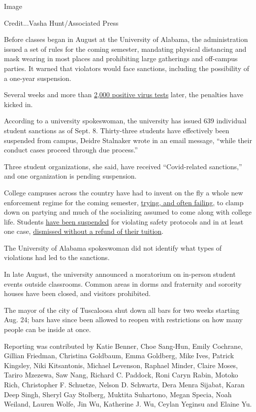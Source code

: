 Image

Credit...Vasha Hunt/Associated Press

Before classes began in August at the University of Alabama, the
administration issued a set of rules for the coming semester, mandating
physical distancing and mask wearing in most places and prohibiting
large gatherings and off-campus parties. It warned that violators would
face sanctions, including the possibility of a one-year suspension.

Several weeks and more than
\href{https://uasystem.edu/covid-19-dashboard/}{2,000 positive virus
tests} later, the penalties have kicked in.

According to a university spokeswoman, the university has issued 639
individual student sanctions as of Sept. 8. Thirty-three students have
effectively been suspended from campus, Deidre Stalnaker wrote in an
email message, ``while their conduct cases proceed through due
process.''

Three student organizations, she said, have received ``Covid-related
sanctions,'' and one organization is pending suspension.

College campuses across the country have had to invent on the fly a
whole new enforcement regime for the coming semester,
\href{https://www.nytimes3xbfgragh.onion/2020/08/22/us/college-campus-covid.html}{trying,
and often failing}, to clamp down on partying and much of the
socializing assumed to come along with college life. Students
\href{https://wvutoday.wvu.edu/stories/2020/09/06/wvu-suspends-29-students-for-covid-19-related-violations-additional-sanctions-pending}{have
been suspended} for violating safety protocols and in at least one case,
\href{https://www.nytimes3xbfgragh.onion/2020/09/05/world/coronavirus-covid.html}{dismissed
without a refund of their tuition}.

The University of Alabama spokeswoman did not identify what types of
violations had led to the sanctions.

In late August, the university announced a moratorium on in-person
student events outside classrooms. Common areas in dorms and fraternity
and sorority houses have been closed, and visitors prohibited.

The mayor of the city of Tuscaloosa shut down all bars for two weeks
starting Aug. 24; bars have since been allowed to reopen with
restrictions on how many people can be inside at once.

Reporting was contributed by Katie Benner, Choe Sang-Hun, Emily
Cochrane, Gillian Friedman, Christina Goldbaum, Emma Goldberg, Mike
Ives, Patrick Kingsley, Niki Kitsantonis, Michael Levenson, Raphael
Minder, Claire Moses, Tariro Mzezewa, Saw Nang, Richard C. Paddock, Roni
Caryn Rabin, Motoko Rich, Christopher F. Schuetze, Nelson D. Schwartz,
Dera Menra Sijabat, Karan Deep Singh, Sheryl Gay Stolberg, Muktita
Suhartono, Megan Specia, Noah Weiland, Lauren Wolfe, Jin Wu, Katherine
J. Wu, Ceylan Yeginsu and Elaine Yu.

